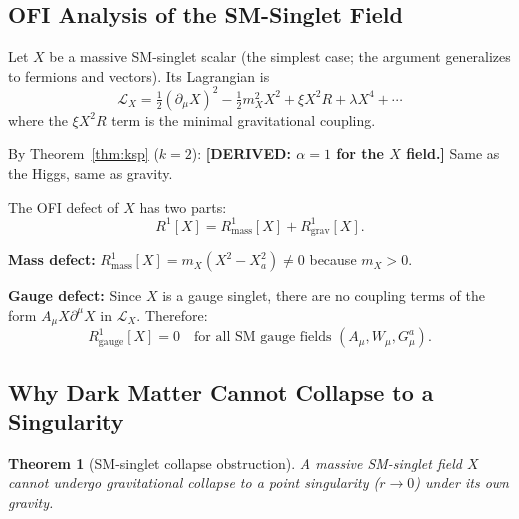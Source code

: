 \documentclass[12pt]{article}
\newtheorem{theorem}{Theorem}[section]
\theoremstyle{definition}
\newcommand{\DERIVED}[1]{\textcolor{derivedcolor}{\textbf{[DERIVED: #1]}}}
\begin{document}
\subsection{OFI Analysis of the SM-Singlet Field}

Let $X$ be a massive SM-singlet scalar (the simplest case; the argument
generalizes to fermions and vectors).  Its Lagrangian is
\begin{equation}
  \mathcal{L}_X = \tfrac{1}{2}(\partial_\mu X)^2 - \tfrac{1}{2}m_X^2 X^2
                 + \xi X^2 R + \lambda X^4 + \cdots
\end{equation}
where the $\xi X^2 R$ term is the minimal gravitational coupling.

By Theorem~\ref{thm:ksp} ($k=2$): \DERIVED{$\alpha=1$ for the $X$ field.}
Same as the Higgs, same as gravity.

The OFI defect of $X$ has two parts:
\begin{equation}
  R^1[X] = R^1_{\mathrm{mass}}[X] + R^1_{\mathrm{grav}}[X].
\end{equation}

\textbf{Mass defect:} $R^1_{\mathrm{mass}}[X] = m_X(X^2 - X_a^2) \neq 0$
because $m_X > 0$.

\textbf{Gauge defect:} Since $X$ is a gauge singlet, there are no coupling
terms of the form $A_\mu X \partial^\mu X$ in $\mathcal{L}_X$.  Therefore:
\begin{equation}
  R^1_{\mathrm{gauge}}[X] = 0 \quad
  \text{for all SM gauge fields } (A_\mu, W_\mu, G_\mu^a).
\end{equation}

\subsection{Why Dark Matter Cannot Collapse to a Singularity}

\begin{theorem}[SM-singlet collapse obstruction]
\label{thm:dm_nocollapse}
A massive SM-singlet field $X$ cannot undergo gravitational collapse to a
point singularity ($r \to 0$) under its own gravity.
\end{theorem}
\end{document}
